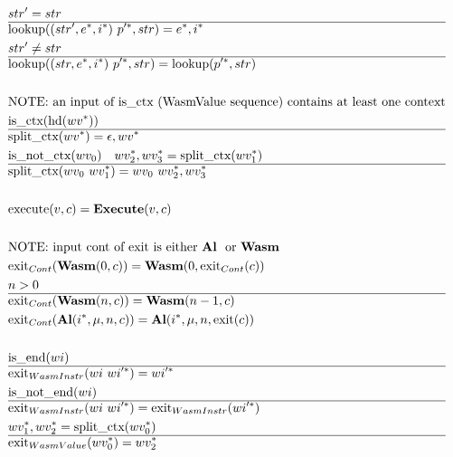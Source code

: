 \begin{align*}
%
  &str' = str \\
  \hline
  &\lookup((str', \seq e, \seq i) ~ \seq{p'}, str) = \seq e, \seq i \\
  &str' \not= str \\
  \hline
  &\lookup((str, \seq e, \seq i) ~ \seq{p'}, str) = \lookup(\seq{p'}, str) \\
%
\newline \\
&\text{NOTE: an input of is\_ctx (WasmValue sequence) contains at least one context} \\
  &\text{is\_ctx}(\text{hd}(\seq{wv})) \\
  \hline
  &\splitctx(\seq{wv}) = \epsilon, \seq{wv} \\
  &\text{is\_not\_ctx}(wv_0) \quad \seq{wv_2}, \seq{wv_3} = \splitctx(\seq{wv_1}) \\
  \hline
  &\splitctx(wv_0 ~ \seq{wv_1}) = wv_0 ~ \seq{wv_2}, \seq{wv_3} \\
%
\newline \\
  &\execute(v, c) = \exe(v, c) \\
%
\newline \\
&\text{NOTE: input cont of exit is either \al ~ or \wasm} \\
  &\exit_{Cont}(\wasm (0, c)) = \wasm(0, \exit_{Cont}(c)) \\
  &n > 0 \\
  \hline
  &\exit_{Cont}(\wasm (n, c)) = \wasm(n-1, c) \\
  &\exit_{Cont}(\al (\seq i, \mu, n, c)) = \al (\seq i, \mu, n, \exit(c)) \\
%
\newline \\
  &\text{is\_end}(wi) \\
  \hline
  &\exit_{WasmInstr}(wi ~ \seq{wi'}) = \seq{wi'} \\
  &\text{is\_not\_end}(wi) \\
  \hline
  &\exit_{WasmInstr}(wi ~ \seq{wi'}) = \exit_{WasmInstr}(\seq{wi'}) \\
%
  &\seq{wv_1}, \seq{wv_2} = \splitctx(\seq{wv_0}) \\
  \hline
  &\exit_{WasmValue}(\seq{wv_0}) = \seq{wv_2} \\

\end{align*}

